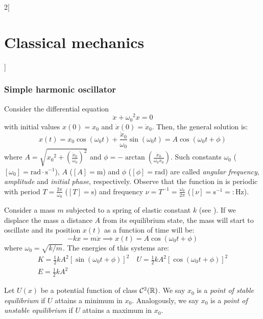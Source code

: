 \documentclass[../../../main_physics.tex]{subfiles}
\begin{document}
\begin{multicols}{2}[\section{Classical mechanics}]
  \subsubsection{Simple harmonic oscillator}
  \begin{proposition}
    Consider the differential equation $$\ddot{x}+{\omega_0}^2 x=0$$ with initial values $x(0)=x_0$ and $\dot{x}(0)=\dot{x}_0$. Then, the general solution is:
    \begin{equation}
      x(t)=x_0\cos(\omega_0t)+\frac{\dot{x}_0}{\omega_0}\sin(\omega_0t)=A\cos(\omega_0t+\phi)
      \label{CM_mhs}
    \end{equation} where $\displaystyle A=\sqrt{{x_0}^2+{\left(\frac{\dot{x}_0}{\omega_0}\right)}^2}$ and $\displaystyle \phi=-\arctan\left(\frac{\dot{x}_0}{\omega_0x_0}\right)$. Such constants $\omega_0$ ($[\omega_0]=\text{rad}\cdot \text{s}^{-1}$), $A$ ($[A]=\text{m}$) and $\phi$ ($[\phi]=\text{rad}$) are called \emph{angular frequency}, \emph{amplitude} and \emph{initial phase}, respectively. Observe that the function in  is periodic with period $T=\frac{2\pi}{\omega_0}$ ($[T]=\text{s}$) and frequency $\nu=T^{-1}=\frac{\omega_0}{2\pi}$ ($[\nu]=\text{s}^{-1}=:\text{Hz}$).
  \end{proposition}
  \begin{proposition}
    Consider a mass $m$ subjected to a spring of elastic constant $k$ (see ). If we displace the mass a distance $A$ from its equilibrium state, the mass will start to oscillate and its position $x(t)$ as a function of time will be:
    $$-kx=m\ddot{x}\implies x(t)=A\cos(\omega_0t+\phi)$$ where $\omega_0=\sqrt{k/m}$. The energies of this systems are:
    \begin{gather*}
      K=\frac{1}{2}kA^2{\left[\sin(\omega_0 t+\phi)\right]}^2\quad U=\frac{1}{2}kA^2{\left[\cos(\omega_0 t+\phi)\right]}^2\\
      E=\frac{1}{2}kA^2
    \end{gather*}
    \begin{center}
      \begin{minipage}{\linewidth}
        \centering
        
        \label{CM_fig1}
      \end{minipage}
    \end{center}
  \end{proposition}
  \begin{definition}
    Let $U(x)$ be a potential function of class $\mathcal{C}^2(\mathbb{R})$. We say $x_0$ is a \emph{point of stable equilibrium} if $U$ attains a minimum in $x_0$. Analogously, we say $x_0$ is a \emph{point of unstable equilibrium} if $U$ attains a maximum in $x_0$.

\end{definition}
\end{multicols}
\end{document}
